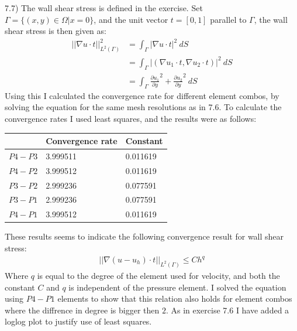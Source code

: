 \documentclass[11pt,a4paper]{report}
\begin{document}
\\
\\
7.7) The wall shear stress is defined in the exercise. Set \\$\Gamma = \{(x,y) \in \Omega | x=0 \}$, and the unit vector $t=[0,1]$ parallel to $\Gamma$, the wall shear stress is then given as: 
\begin{align*}
||\nabla u\cdot t||_{L^2(\Gamma)}^2 &= \int_{\Gamma} |\nabla u \cdot t|^2  \ dS \\
&=  \int_{\Gamma} |(\nabla u_1 \cdot t,\nabla u_2 \cdot t)|^2  \ dS \\
&=\int_{\Gamma} \frac{\partial u_1}{\partial y}^2 + \frac{\partial u_2}{\partial y}^2 \ dS
\end{align*} 
Using this I calculated the convergence rate for different element combos, by solving the equation for the same mesh resolutions as in 7.6. To calculate the convergence rates I used least squares, and the results were as follows:
\begin{center}
    \begin{tabular}{| l | l | l |}
    \hline
     & Convergence rate & Constant   \\ \hline
    $P4-P3$ & 3.999511 & 0.011619    \\ \hline
    $P4-P2$ & 3.999512 & 0.011619	\\ \hline
    $P3-P2$ & 2.999236 & 0.077591    \\ \hline
    $P3-P1$ & 2.999236 & 0.077591	\\ \hline
    	$P4-P1$ & 3.999512 & 0.011619	\\ \hline
    \end{tabular}
\end{center}
These results seems to indicate the following convergence result for wall shear stress:
\begin{align*}
||\nabla (u-u_h)\cdot t||_{L^2(\Gamma)} \leq Ch^q
\end{align*} 
Where $q$ is equal to the degree of the element used for velocity, and both the constant $C$ and $q$ is independent of the pressure element. I solved the equation using $P4-P1$ elements to show that this relation also holds for element combos where the diffrence in degree is bigger then $2$. As in exercise 7.6 I have added a loglog plot to justify use of least squares.
\end{document}
